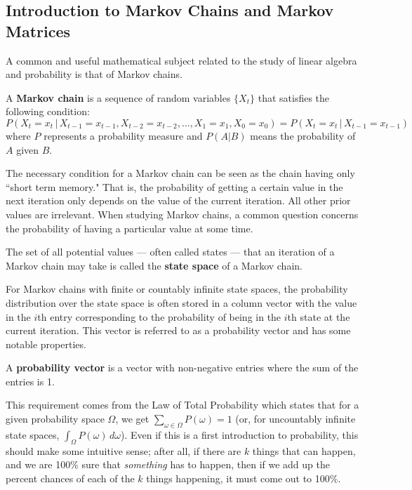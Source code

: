 \documentclass[10pt]{article}
\newenvironment{defn}[2][Definition:]{\begin{trivlist}
\item[\hskip \labelsep {\bfseries #1}\hskip \labelsep {\bfseries #2}]}{\end{trivlist}}
\begin{document}
\subsection{Introduction to Markov Chains and Markov Matrices}
A common and useful mathematical subject related to the study of linear algebra and probability is that of Markov chains.
\begin{defn}{}
A \textbf{Markov chain} is a sequence of random variables $\{X_t\}$ that satisfies the following condition:
\[P(X_t = x_t\,|\,X_{t-1} = x_{t-1}, X_{t-2} = x_{t-2}, \dots, X_1 = x_1, X_0 = x_0) = P(X_t = x_t\,|\,X_{t-1} = x_{t-1})\]
where $P$ represents a probability measure and $P(A|B)$ means the probability of $A$ given $B$.
\end{defn}
The necessary condition for a Markov chain can be seen as the chain having only ``short term memory." That is, the probability of getting a certain value in the next iteration only depends on the value of the current iteration. All other prior values are irrelevant. When studying Markov chains, a common question concerns the probability of having a particular value at some time.
\begin{defn}{}
The set of all potential values --- often called states --- that an iteration of a Markov chain may take is called the \textbf{state space} of a Markov chain.
\end{defn}
For Markov chains with finite or countably infinite state spaces, the probability distribution over the state space is often stored in a column vector with the value in the $i$th entry corresponding to the probability of being in the $i$th state at the current iteration. This vector is referred to as a probability vector and has some notable properties.
\begin{defn}{}
A \textbf{probability vector} is a vector with non-negative entries where the sum of the entries is 1.
\end{defn}
This requirement comes from the Law of Total Probability which states that for a given probability space $\Omega$, we get $\sum_{\omega\in\Omega} P(\omega)=1$ (or, for uncountably infinite state spaces, $\int_\Omega P(\omega)\, d\omega$). Even if this is a first introduction to probability, this should make some intuitive sense; after all, if there are $k$ things that can happen, and we are 100\% sure that \textit{something} has to happen, then if we add up the percent chances of each of the $k$ things happening, it must come out to 100\%.\vspace{0.5cm}\\
\end{document}
